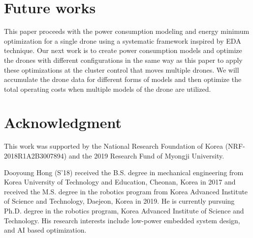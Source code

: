 \documentclass[journal]{./template/IEEEtran}
\begin{document}
\section{Future works}

This paper proceeds with the power consumption modeling and energy minimum optimization for a single drone using a systematic framework inspired by EDA technique. Our next work is to create power consumption models and optimize the drones with different configurations in the same way as this paper to apply these optimizations at the cluster control that moves multiple drones. We will accumulate the drone data for different forms of models and then optimize the total operating costs when multiple models of the drone are utilized.










\section*{Acknowledgment}
This work was supported by the National Research Foundation of Korea (NRF-2018R1A2B3007894) and the 2019 Research Fund of Myongji University. 



\begin{IEEEbiography}{Dooyoung Hong}
(S'18) received the B.S. degree in mechanical engineering from Korea University of Technology and Education, Cheonan, Korea in 2017 and received the M.S. degree in the robotics program from Korea Advanced Institute of Science and Technology, Daejeon, Korea in 2019. He is currently pursuing Ph.D. degree in the robotics program, Korea Advanced Institute of Science and Technology. His research interests include low-power embedded system design, and AI based optimization.
\end{IEEEbiography}
\end{document}
